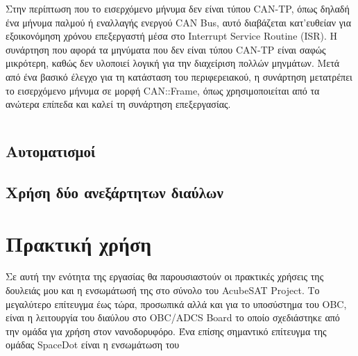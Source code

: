 \documentclass[a4paper,nobib,justified]{tufte-book}
\begin{document}
Στην περίπτωση που το εισερχόμενο μήνυμα δεν είναι τύπου CAN-TP, όπως δηλαδή ένα μήνυμα παλμού ή εναλλαγής ενεργού CAN Bus, αυτό διαβάζεται κατ'ευθείαν για εξοικονόμηση χρόνου επεξεργαστή μέσα στο Interrupt Service Routine (ISR). Η συνάρτηση που αφορά τα μηνύματα που δεν είναι τύπου CAN-TP είναι σαφώς μικρότερη, καθώς δεν υλοποιεί λογική για την διαχείριση πολλών μηνμάτων. Μετά από ένα βασικό έλεγχο για τη κατάσταση του περιφερειακού, η συνάρτηση μετατρέπει το εισερχόμενο μήνυμα σε μορφή CAN::Frame, όπως χρησιμοποιείται από τα ανώτερα επίπεδα και καλεί τη συνάρτηση επεξεργασίας.
\inputminted{c++}{code/examples/driver-non-tp-receiver.cpp}

\section{Αυτοματισμοί}

\section{Χρήση δύο ανεξάρτητων διαύλων}


\chapter{Πρακτική χρήση}
Σε αυτή την ενότητα της εργασίας θα παρουσιαστούν οι πρακτικές χρήσεις της δουλειάς μου και η ενσωμάτωσή της στο σύνολο του AcubeSAT Project. Το μεγαλύτερο επίτευγμα έως τώρα, προσωπικά αλλά και για το υποσύστημα του OBC, είναι η λειτουργία του διαύλου στο OBC/ADCS Board το οποίο σχεδιάστηκε από την ομάδα για χρήση στον νανοδορυφόρο. Ένα επίσης σημαντικό επίτευγμα της ομάδας SpaceDot είναι η ενσωμάτωση του  
\end{document}
